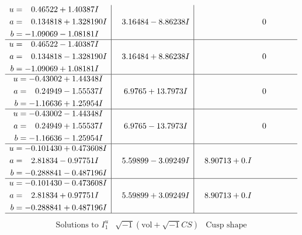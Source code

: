\documentclass[1p]{elsarticle_modified}
\theoremstyle{definition}
\newcommand{\I}{\sqrt{-1}}
\begin{document}
$$\begin{array}{c|c|c}
\begin{aligned}
u &= \phantom{-}0.46522 + 1.40387 I \\
a &= \phantom{-}0.134818 + 1.328190 I \\
b &= -1.09069 - 1.08181 I\end{aligned}
 & \phantom{-}3.16484 - 8.86238 I & \phantom{-0.000000 } 0 \\ \hline\begin{aligned}
u &= \phantom{-}0.46522 - 1.40387 I \\
a &= \phantom{-}0.134818 - 1.328190 I \\
b &= -1.09069 + 1.08181 I\end{aligned}
 & \phantom{-}3.16484 + 8.86238 I & \phantom{-0.000000 } 0 \\ \hline\begin{aligned}
u &= -0.43002 + 1.44348 I \\
a &= \phantom{-}0.24949 - 1.55537 I \\
b &= -1.16636 + 1.25954 I\end{aligned}
 & \phantom{-}6.9765 + 13.7973 I & \phantom{-0.000000 } 0 \\ \hline\begin{aligned}
u &= -0.43002 - 1.44348 I \\
a &= \phantom{-}0.24949 + 1.55537 I \\
b &= -1.16636 - 1.25954 I\end{aligned}
 & \phantom{-}6.9765 - 13.7973 I & \phantom{-0.000000 } 0 \\ \hline\begin{aligned}
u &= -0.101430 + 0.473608 I \\
a &= \phantom{-}2.81834 - 0.97751 I \\
b &= -0.288841 - 0.487196 I\end{aligned}
 & \phantom{-}5.59899 - 3.09249 I & \phantom{-}8.90713 + 0. I\phantom{ +0.000000I} \\ \hline\begin{aligned}
u &= -0.101430 - 0.473608 I \\
a &= \phantom{-}2.81834 + 0.97751 I \\
b &= -0.288841 + 0.487196 I\end{aligned}
 & \phantom{-}5.59899 + 3.09249 I & \phantom{-}8.90713 + 0. I\phantom{ +0.000000I}\\
 \hline 
 \end{array}$$\newpage$$\begin{array}{c|c|c}  
\text{Solutions to }I^u_{1}& \I (\text{vol} + \sqrt{-1}CS) & \text{Cusp shape}\\

\end{array}$$
\end{document}
